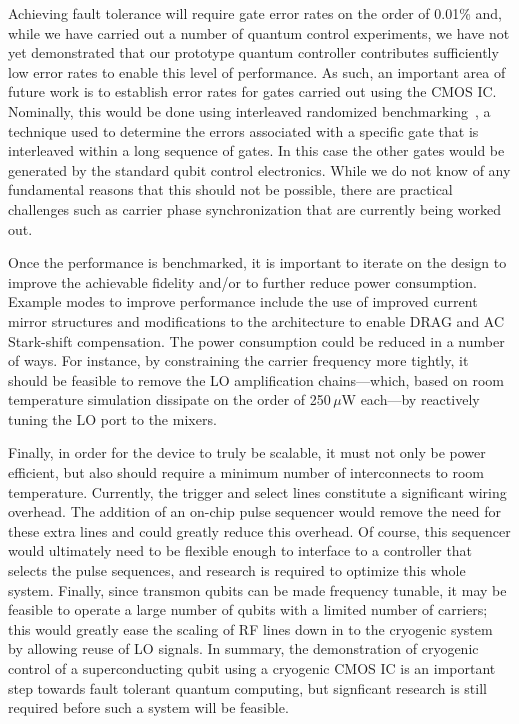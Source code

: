 \documentclass[journal]{IEEEtran}
\newcommand{\CR}[1]{{\color{black}#1}}
\begin{document}
\CR{Achieving fault tolerance will require gate error rates on the order of 0.01\% and, while we have carried out a number of quantum control experiments, we have not yet demonstrated that our prototype quantum controller contributes sufficiently low error rates to enable this level of performance. As such, an important area of future work is to establish error rates for gates carried out using the CMOS IC. Nominally, this would be done using interleaved randomized benchmarking~\cite{magesan2012efficient}, a technique used to determine the errors associated with a specific gate that is interleaved within a long sequence of gates. In this case the other gates would be generated by the standard qubit control electronics. While we do not know of any fundamental reasons that this should not be possible, there are practical challenges such as carrier phase synchronization that are currently being worked out.}

\CR{Once the performance is benchmarked, it is important to iterate on the design to improve the achievable fidelity and/or to further reduce power consumption. Example modes to improve performance include the use of improved current mirror structures and modifications to the architecture to enable DRAG and AC Stark-shift compensation. The power consumption could be reduced in a number of ways. For instance, by constraining the carrier frequency more tightly, it should be feasible to remove the LO amplification chains---which, based on room temperature simulation dissipate on the order of 250\,$\mu$W each---by reactively tuning the LO port to the mixers.}

\CR{Finally, in order for the device to truly be scalable, it must not only be power efficient, but also should require a minimum number of interconnects to room temperature. Currently, the trigger and select lines constitute a significant wiring overhead. The addition of an on-chip pulse sequencer would remove the need for these extra lines and could greatly reduce this overhead. Of course, this sequencer would ultimately need to be flexible enough to interface to a controller that selects the pulse sequences, and research is required to optimize this whole system. Finally, since transmon qubits can be made frequency tunable, it may be feasible to operate a large number of qubits with a limited number of carriers; this would greatly ease the scaling of RF lines down in to the cryogenic system by allowing reuse of LO signals. In summary, the demonstration of cryogenic control of a superconducting qubit using a cryogenic CMOS IC is an important step towards fault tolerant quantum computing, but signficant research is still  required before such a system will be feasible.}
\end{document}

